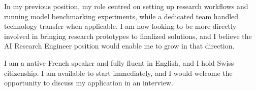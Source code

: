 \documentclass[11pt, a4paper]{awesome-cv}
\begin{document}
\begin{cvletter}
In my previous position, my role centred on setting up research workflows and running model benchmarking experiments, while a dedicated team handled technology transfer when applicable. I am now looking to be more directly involved in bringing research prototypes to finalized solutions, and I believe the AI Research Engineer position would enable me to grow in that direction.

I am a native French speaker and fully fluent in English, and I hold Swiss citizenship. I am available to start immediately, and I would welcome the opportunity to discuss my application in an interview.





\end{cvletter}


\makeletterclosing
\end{document}
